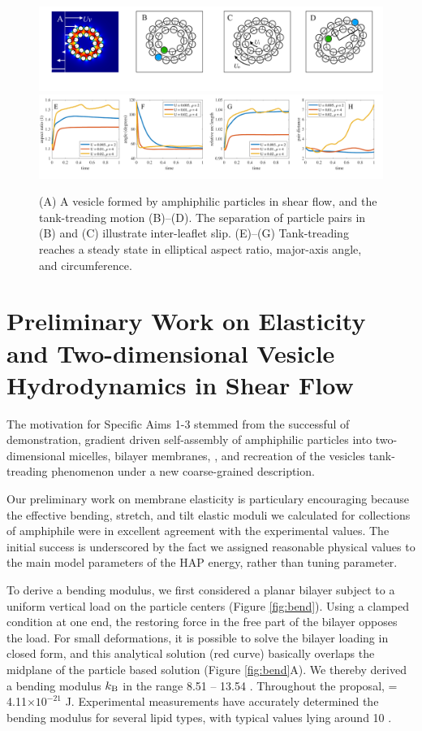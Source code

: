 \begin{figure}[!]
\begin{center}
\includegraphics[width=1\textwidth]{figures/PW_fig1A-D.pdf}
\includegraphics[width=1\textwidth]{figures/PW_fig1E-H.pdf}
\end{center}
\vspace{-0.3in}
\caption{\label{fig:tanktreading}\footnotesize (A) A vesicle formed by
  amphiphilic particles in shear flow, and the tank-treading motion
  (B)--(D). The separation of particle pairs in (B) and (C) illustrate
  inter-leaflet slip.  (E)--(G) Tank-treading reaches a steady state in
  elliptical aspect ratio, major-axis angle, and circumference.}
\end{figure}
\section{Preliminary Work on Elasticity and Two-dimensional Vesicle Hydrodynamics in Shear Flow}
\label{sec:preliminary_work}
The motivation for Specific Aims 1-3
stemmed from the successful of demonstration, gradient driven
self-assembly of amphiphilic particles into two-dimensional micelles,
bilayer membranes, \cite{Fu2018_SIAM}, and recreation of the vesicles tank-treading phenomenon
under a new coarse-grained description.

Our preliminary work on membrane elasticity 
is particulary encouraging because the effective bending, stretch, and tilt elastic moduli we calculated
for collections of amphiphile were in excellent agreement with the experimental values.
The initial success is underscored by the fact we assigned reasonable physical values to 
the main model parameters of the HAP energy, rather than tuning parameter.

To derive a bending modulus, we first considered a planar bilayer subject to a uniform vertical load on the particle centers (Figure \ref{fig:bend}). 
Using a clamped condition at one end, the restoring force in the free part of the bilayer opposes the load.
For small deformations, it is possible to solve the bilayer loading in closed form, and 
this analytical solution (red curve) basically overlaps the midplane of the particle based solution (Figure \ref{fig:bend}A).
We thereby derived a bending modulus $k_{\mathrm{B}}$ in the range 8.51 -- 13.54 \kBT. Throughout the proposal, \kBT\; = 4.11$\times 10^{-21}$ J.
Experimental measurements have accurately determined the bending modulus for several lipid types, with 
typical values lying around 10 \kBT\; \cite{Naetal15,VeBrPa15,NAGLE2000159,PhysRevLett.113.248102}.

